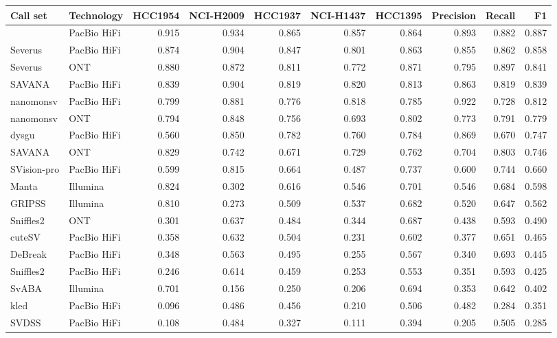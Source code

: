 \begin{tabular}{llrrrrrrrr}
\toprule
Call set & Technology & HCC1954 & NCI-H2009 & HCC1937 & NCI-H1437 & HCC1395 & Precision & Recall & F1 \\
\midrule
\tool{} & PacBio HiFi & 0.915 & 0.934 & 0.865 & 0.857 & 0.864 & 0.893 & 0.882 & 0.887 \\
Severus & PacBio HiFi & 0.874 & 0.904 & 0.847 & 0.801 & 0.863 & 0.855 & 0.862 & 0.858 \\
Severus & ONT & 0.880 & 0.872 & 0.811 & 0.772 & 0.871 & 0.795 & 0.897 & 0.841 \\
SAVANA & PacBio HiFi & 0.839 & 0.904 & 0.819 & 0.820 & 0.813 & 0.863 & 0.819 & 0.839 \\
nanomonsv & PacBio HiFi & 0.799 & 0.881 & 0.776 & 0.818 & 0.785 & 0.922 & 0.728 & 0.812 \\
nanomonsv & ONT & 0.794 & 0.848 & 0.756 & 0.693 & 0.802 & 0.773 & 0.791 & 0.779 \\
dysgu & PacBio HiFi & 0.560 & 0.850 & 0.782 & 0.760 & 0.784 & 0.869 & 0.670 & 0.747 \\
SAVANA & ONT & 0.829 & 0.742 & 0.671 & 0.729 & 0.762 & 0.704 & 0.803 & 0.746 \\
SVision-pro & PacBio HiFi & 0.599 & 0.815 & 0.664 & 0.487 & 0.737 & 0.600 & 0.744 & 0.660 \\
Manta & Illumina & 0.824 & 0.302 & 0.616 & 0.546 & 0.701 & 0.546 & 0.684 & 0.598 \\
GRIPSS & Illumina & 0.810 & 0.273 & 0.509 & 0.537 & 0.682 & 0.520 & 0.647 & 0.562 \\
Sniffles2 & ONT & 0.301 & 0.637 & 0.484 & 0.344 & 0.687 & 0.438 & 0.593 & 0.490 \\
cuteSV & PacBio HiFi & 0.358 & 0.632 & 0.504 & 0.231 & 0.602 & 0.377 & 0.651 & 0.465 \\
DeBreak & PacBio HiFi & 0.348 & 0.563 & 0.495 & 0.255 & 0.567 & 0.340 & 0.693 & 0.445 \\
Sniffles2 & PacBio HiFi & 0.246 & 0.614 & 0.459 & 0.253 & 0.553 & 0.351 & 0.593 & 0.425 \\
SvABA & Illumina & 0.701 & 0.156 & 0.250 & 0.206 & 0.694 & 0.353 & 0.642 & 0.402 \\
kled & PacBio HiFi & 0.096 & 0.486 & 0.456 & 0.210 & 0.506 & 0.482 & 0.284 & 0.351 \\
SVDSS & PacBio HiFi & 0.108 & 0.484 & 0.327 & 0.111 & 0.394 & 0.205 & 0.505 & 0.285 \\
\bottomrule
\end{tabular}
